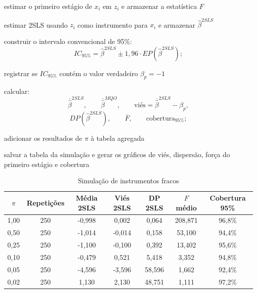 \documentclass[12pt,a4paper]{article}
\begin{document}
\begin{enumerate}[label=\textbf{\arabic*.}]
\begin{algorithm}[H]
{{{            estimar o primeiro estágio de $x_i$ em $z_i$ e armazenar a estatística $F$\;

            estimar 2SLS usando $z_i$ como instrumento para $x_i$ e armazenar $\hat{\beta}^{2SLS}$\;

            construir o intervalo convencional de 95\%:
            \[
                IC_{95\%}
                =
                \hat{\beta}^{2SLS}
                \pm
                1{,}96\cdot EP(\hat{\beta}^{2SLS});
            \]

            registrar se $IC_{95\%}$ contém o valor verdadeiro $\beta_p=-1$\;
        }

        calcular:
        \[
            \overline{\hat{\beta}}^{2SLS}, \qquad
            \overline{\hat{\beta}}^{MQO}, \qquad
            \text{viés}=\overline{\hat{\beta}}^{2SLS}-\beta_p,
        \]
        \[
            DP(\hat{\beta}^{2SLS}), \qquad
            \overline{F}, \qquad
            \text{cobertura}_{95\%};
        \]

        adicionar os resultados de $\pi$ à tabela agregada\;
    }

    salvar a tabela da simulação e gerar os gráficos de viés, dispersão, força do primeiro estágio e cobertura\;

}
\end{algorithm}

\begin{table}[H]
    \centering
    \caption{Simulação de instrumentos fracos}
    \label{tab:simulacao_instrumentos_fracos}
    \begin{tabular}{ccccccc}
        \hline
        $\pi$ & Repetições & Média 2SLS & Viés 2SLS & DP 2SLS & $F$ médio & Cobertura 95\% \\
        \hline
        1,00 & 250 & -0,998 &  0,002 &  0,064 & 208,871 & 96,8\% \\
        0,50 & 250 & -1,014 & -0,014 &  0,158 &  53,100 & 94,4\% \\
        0,25 & 250 & -1,100 & -0,100 &  0,392 &  13,402 & 95,6\% \\
        0,10 & 250 & -0,479 &  0,521 &  5,418 &   3,352 & 94,8\% \\
        0,05 & 250 & -4,596 & -3,596 & 58,596 &   1,662 & 92,4\% \\
        0,02 & 250 &  1,130 &  2,130 & 48,751 &   1,111 & 97,2\% \\
        \hline
    \end{tabular}
\end{table}


\end{enumerate}
\end{document}
